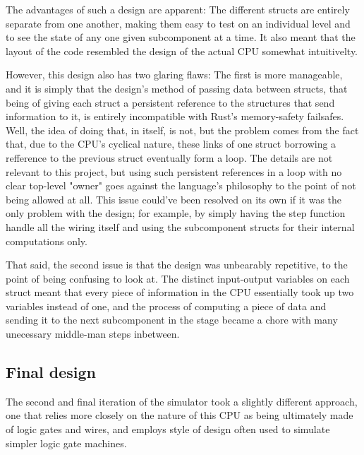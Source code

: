 \documentclass[12pt,twoside]{reedthesis}
\begin{document}
The advantages of such a design are apparent: The different structs are entirely separate from one another, making them easy to test on an individual level and to see the state of any one given subcomponent at a time. It also meant that the layout of the code resembled the design of the actual CPU somewhat intuitivelty.

However, this design also has two glaring flaws: The first is more manageable, and it is simply that the design's method of passing data between structs, that being of giving each struct a persistent reference to the structures that send information to it, is entirely incompatible with Rust's memory-safety failsafes. Well, the idea of doing that, in itself, is not, but the problem comes from the fact that, due to the CPU's cyclical nature, these links of one struct borrowing a refference to the previous struct eventually form a loop. The details are not relevant to this project, but using such persistent references in a loop with no clear top-level "owner" goes against the language's philosophy to the point of not being allowed at all. This issue could've been resolved on its own if it was the only problem with the design; for example, by simply having the step function handle all the wiring itself and using the subcomponent structs for their internal computations only.

That said, the second issue is that the design was unbearably repetitive, to the point of being confusing to look at. The distinct input-output variables on each struct meant that every piece of information in the CPU essentially took up two variables instead of one, and the process of computing a piece of data and sending it to the next subcomponent in the stage became a chore with many unecessary middle-man steps inbetween.

\subsection*{Final design}

The second and final iteration of the simulator took a slightly different approach, one that relies more closely on the nature of this CPU as being ultimately made of logic gates and wires, and employs style of design often used to simulate simpler logic gate machines.
\end{document}
